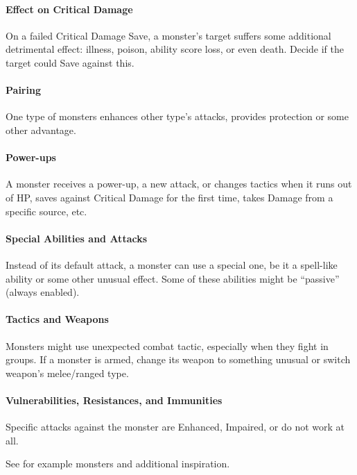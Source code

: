 \documentclass[itdr]{subfiles}
\begin{document}
\vfill
\paragraph{Effect on Critical Damage}
On a failed Critical Damage Save, a monster's target suffers some additional detrimental effect: illness, poison, ability score loss, or even death. Decide if the target could Save against this.

\vfill
\paragraph{Pairing}
One type of monsters enhances other type's attacks, provides protection or some other advantage.

\vfill
\paragraph{Power-ups}
A monster receives a power-up, a new attack, or changes tactics when it runs out of HP, saves against Critical Damage for the first time, takes Damage from a specific source, etc.

\vfill
\paragraph{Special Abilities and Attacks}
Instead of its default attack, a monster can use a special one, be it a spell-like ability or some other unusual effect. Some of these abilities might be ``passive'' (always enabled).

\vfill
\paragraph{Tactics and Weapons}
Monsters might use unexpected combat tactic, especially when they fight in groups. If a monster is armed, change its weapon to something unusual or switch weapon's melee/ranged type.

\vfill
\paragraph{Vulnerabilities, Resistances, and Immunities}
Specific attacks against the monster are Enhanced, Impaired, or do not work at all.

\vfill
\begin{dbox}
	See \textbf{} for example monsters and additional inspiration.
\end{dbox}
\end{document}
